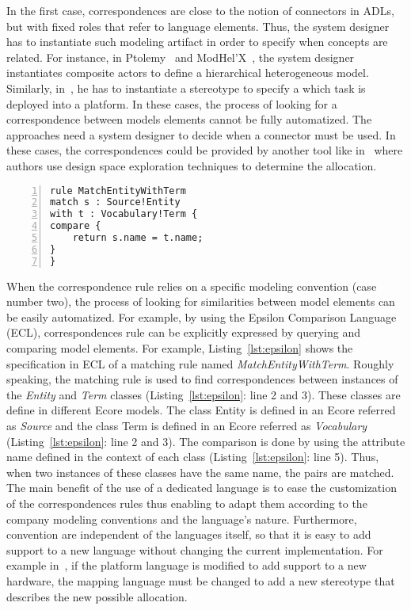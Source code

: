 In the first case, correspondences are close to the notion of connectors in ADLs, but with fixed roles that refer to language elements. Thus, the system designer has to instantiate such modeling artifact in order to specify when concepts are related. For instance, in Ptolemy~\cite{ptoleframebib} and ModHel'X~\cite{modhelxbib}, the system designer instantiates composite actors to define a hierarchical heterogeneous model. Similarly, in~\cite{dinatale}, he has to instantiate a stereotype to specify a which task is deployed into a platform. In these cases, the process of looking for a correspondence between models elements cannot be fully automatized. The approaches need a system designer to decide when a connector must be used. In these cases, the correspondences could be provided by another tool like in~\cite{kofmanbib} where authors use design space exploration techniques to determine the allocation.%
	\begin{lstlisting}[language=epsilon,
	caption={Matching rule in the Epsilon Comparison Language},
	label={lst:epsilon}, 
	basicstyle=\scriptsize\ttfamily, backgroundcolor=\color{LGrey}, numbers=left, xleftmargin=2pt]
rule MatchEntityWithTerm
match s : Source!Entity
with t : Vocabulary!Term {
compare {
	return s.name = t.name;
}
}
\end{lstlisting}
	
When the correspondence rule relies on a specific modeling convention (case number two), the process of looking for similarities between model elements can be easily automatized. For example, by using the Epsilon Comparison Language (ECL), correspondences rule can be explicitly expressed by querying and comparing model elements. For example, Listing~\ref{lst:epsilon} shows the specification in ECL of a matching rule named \emph{MatchEntityWithTerm}. Roughly speaking, the matching rule is used to find correspondences between instances of the \emph{Entity} and \emph{Term} classes (Listing~\ref{lst:epsilon}: line 2 and 3). These classes are define in different Ecore models. The class Entity is defined in an Ecore referred as \emph{Source} and the class Term is defined in an Ecore referred as \emph{Vocabulary} (Listing~\ref{lst:epsilon}: line 2 and 3). The comparison is done by using the attribute name defined in the context of each class (Listing~\ref{lst:epsilon}: line 5). Thus, when two instances of these classes have the same name, the pairs are matched. The main benefit of the use of a dedicated language is to ease the customization of the correspondences rules thus enabling to adapt them according to the company modeling conventions and the language's nature. Furthermore, convention are independent of the languages itself, so that it is easy to add support to a new language without changing the current implementation. For example in~\cite{dinatale}, if the platform language is modified to add support to a new hardware, the mapping language must be changed to add a new stereotype that describes the new possible allocation.


